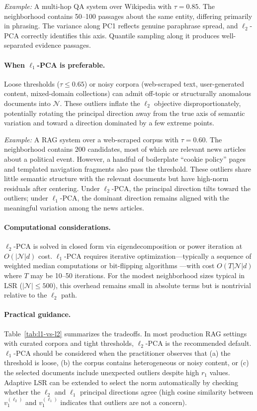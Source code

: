 \documentclass{article}
\begin{document}
\emph{Example:} A multi-hop QA system over Wikipedia with $\tau = 0.85$. The neighborhood contains 50--100 passages about the same entity, differing primarily in phrasing. The variance along PC1 reflects genuine paraphrase spread, and $\ell_2$-PCA correctly identifies this axis. Quantile sampling along it produces well-separated evidence passages.

\paragraph{When $\ell_1$-PCA is preferable.}
Loose thresholds ($\tau \leq 0.65$) or noisy corpora (web-scraped text, user-generated content, mixed-domain collections) can admit off-topic or structurally anomalous documents into $\mathcal{N}$. These outliers inflate the $\ell_2$ objective disproportionately, potentially rotating the principal direction away from the true axis of semantic variation and toward a direction dominated by a few extreme points.

\emph{Example:} A RAG system over a web-scraped corpus with $\tau = 0.60$. The neighborhood contains 200 candidates, most of which are relevant news articles about a political event. However, a handful of boilerplate ``cookie policy'' pages and templated navigation fragments also pass the threshold. These outliers share little semantic structure with the relevant documents but have high-norm residuals after centering. Under $\ell_2$-PCA, the principal direction tilts toward the outliers; under $\ell_1$-PCA, the dominant direction remains aligned with the meaningful variation among the news articles.

\paragraph{Computational considerations.}
$\ell_2$-PCA is solved in closed form via eigendecomposition or power iteration at $O(|\mathcal{N}|d)$ cost. $\ell_1$-PCA requires iterative optimization---typically a sequence of weighted median computations or bit-flipping algorithms \cite{markopoulos2017l1}---with cost $O(T|\mathcal{N}|d)$ where $T$ may be 10--50 iterations. For the modest neighborhood sizes typical in LSR ($|\mathcal{N}| \leq 500$), this overhead remains small in absolute terms but is nontrivial relative to the $\ell_2$ path.

\paragraph{Practical guidance.}
Table~\ref{tab:l1-vs-l2} summarizes the tradeoffs. In most production RAG settings with curated corpora and tight thresholds, $\ell_2$-PCA is the recommended default. $\ell_1$-PCA should be considered when the practitioner observes that (a) the threshold is loose, (b) the corpus contains heterogeneous or noisy content, or (c) the selected documents include unexpected outliers despite high $r_1$ values. Adaptive LSR can be extended to select the norm automatically by checking whether the $\ell_2$ and $\ell_1$ principal directions agree (high cosine similarity between $v_1^{(\ell_2)}$ and $v_1^{(\ell_1)}$ indicates that outliers are not a concern).
\end{document}
